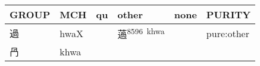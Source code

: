 \documentclass[14pt,a4paper]{scrartcl}
\begin{document}
\begin{longtable}[c]{@{}llllll@{}}
\toprule
\begin{minipage}[b]{0.14\columnwidth}\raggedright\strut
GROUP
\strut\end{minipage} &
\begin{minipage}[b]{0.14\columnwidth}\raggedright\strut
MCH
\strut\end{minipage} &
\begin{minipage}[b]{0.14\columnwidth}\raggedright\strut
qu
\strut\end{minipage} &
\begin{minipage}[b]{0.14\columnwidth}\raggedright\strut
other
\strut\end{minipage} &
\begin{minipage}[b]{0.14\columnwidth}\raggedright\strut
none
\strut\end{minipage} &
\begin{minipage}[b]{0.14\columnwidth}\raggedright\strut
PURITY
\strut\end{minipage}\tabularnewline
\midrule
\endhead
\begin{minipage}[t]{0.14\columnwidth}\raggedright\strut
過
\strut\end{minipage} &
\begin{minipage}[t]{0.14\columnwidth}\raggedright\strut
hwaX
\strut\end{minipage} &
\begin{minipage}[t]{0.14\columnwidth}\raggedright\strut
\strut\end{minipage} &
\begin{minipage}[t]{0.14\columnwidth}\raggedright\strut
薖\textsuperscript{8596~khwa}
\strut\end{minipage} &
\begin{minipage}[t]{0.14\columnwidth}\raggedright\strut
\strut\end{minipage} &
\begin{minipage}[t]{0.14\columnwidth}\raggedright\strut
pure:other
\strut\end{minipage}\tabularnewline
\begin{minipage}[t]{0.14\columnwidth}\raggedright\strut
冎
\strut\end{minipage} &
\begin{minipage}[t]{0.14\columnwidth}\raggedright\strut
khwa
\strut\end{minipage} &
\begin{minipage}[t]{0.14\columnwidth}\raggedright\strut
\strut\end{minipage} &

\end{longtable}
\end{document}
